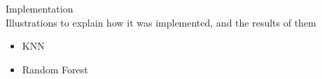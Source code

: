 \documentclass[report]{subfiles}
\begin{document}
Implementation\\
Illustrations to explain how it was implemented, and the results of them
\begin{itemize}
	\item KNN
	\item Random Forest
\end{itemize}
\end{document}

